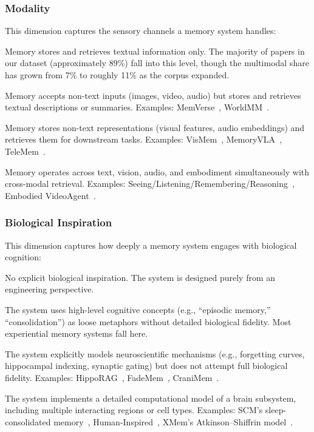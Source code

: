 \subsubsection{Modality}

This dimension captures the sensory channels a memory system handles:

\begin{description}[nosep]
  \item[Text-only.] Memory stores and retrieves textual information only. The majority of papers in our dataset (approximately 89\%) fall into this level, though the multimodal share has grown from 7\% to roughly 11\% as the corpus expanded.
  \item[Multimodal-in.] Memory accepts non-text inputs (images, video, audio) but stores and retrieves textual descriptions or summaries. Examples: MemVerse~\cite{Unknown2025MemVerse}, WorldMM~\cite{Unknown2025WorldMM}.
  \item[Multimodal-out.] Memory stores non-text representations (visual features, audio embeddings) and retrieves them for downstream tasks. Examples: VisMem~\cite{Unknown2025VisMem}, MemoryVLA~\cite{Unknown2025MemoryVLA}, TeleMem~\cite{Unknown2026TeleMem}.
  \item[Full-multimodal.] Memory operates across text, vision, audio, and embodiment simultaneously with cross-modal retrieval. Examples: Seeing/Listening/Remembering/Reasoning~\cite{Unknown2025SeeingListeningRemem}, Embodied VideoAgent~\cite{Unknown2025EmbodiedVideoAgent}.
\end{description}

\subsubsection{Biological Inspiration}

This dimension captures how deeply a memory system engages with biological cognition:

\begin{description}[nosep]
  \item[None.] No explicit biological inspiration. The system is designed purely from an engineering perspective.
  \item[Cognitive-metaphor.] The system uses high-level cognitive concepts (e.g., ``episodic memory,'' ``consolidation'') as loose metaphors without detailed biological fidelity. Most experiential memory systems fall here.
  \item[Neuro-inspired.] The system explicitly models neuroscientific mechanisms (e.g., forgetting curves, hippocampal indexing, synaptic gating) but does not attempt full biological fidelity. Examples: HippoRAG~\cite{Unknown2024HippoRAG}, FadeMem~\cite{Unknown2026FadeMem}, CraniMem~\cite{Unknown2026CraniMem}.
  \item[Brain-architecture.] The system implements a detailed computational model of a brain subsystem, including multiple interacting regions or cell types. Examples: SCM's sleep-consolidated memory~\cite{Unknown2026SCM}, Human-Inspired~\cite{Unknown2026HumanInspiredMemoryA}, XMem's Atkinson--Shiffrin model~\cite{Unknown2022XMem}.
\end{description}

